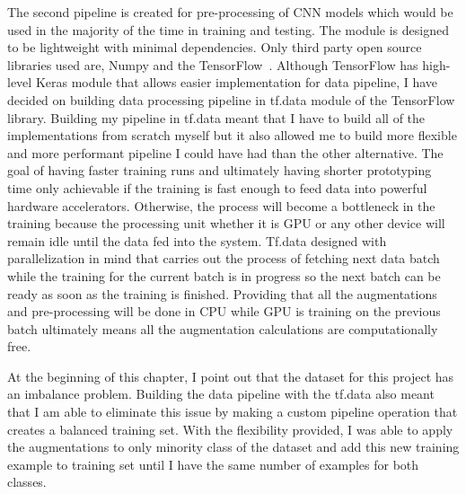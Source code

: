 The second pipeline is created for pre-processing of CNN models which would be used in the majority of the time in training and testing.
The module is designed to be lightweight with minimal dependencies. Only third party open source libraries used are, Numpy and the TensorFlow~\cite{tensorflow}.
Although TensorFlow has high-level Keras module that allows easier implementation for data pipeline, I have decided on building data processing pipeline in tf.data module of the TensorFlow library.
Building my pipeline in tf.data meant that I have to build all of the implementations from scratch myself but it also allowed me to build more flexible and more performant pipeline I could have had than the other alternative. 
The goal of having faster training runs and ultimately having shorter prototyping time only achievable if the training is fast enough to feed data into powerful hardware accelerators.
Otherwise, the process will become a bottleneck in the training because the processing unit whether it is GPU or any other device will remain idle until the data fed into the system.
Tf.data designed with parallelization in mind that carries out the process of fetching next data batch while the training for the current batch is in progress so the next batch can be ready as soon as the training is finished.
Providing that all the augmentations and pre-processing will be done in CPU while GPU is training on the previous batch ultimately means all the augmentation calculations are computationally free.


At the beginning of this chapter, I point out that the dataset for this project has an imbalance problem.
Building the data pipeline with the tf.data also meant that I am able to eliminate this issue by making a custom pipeline operation that creates a balanced training set.
With the flexibility provided, I was able to apply the augmentations to only minority class of the dataset and add this new training example to training set until I have the same number of examples for both classes.




\clearpage